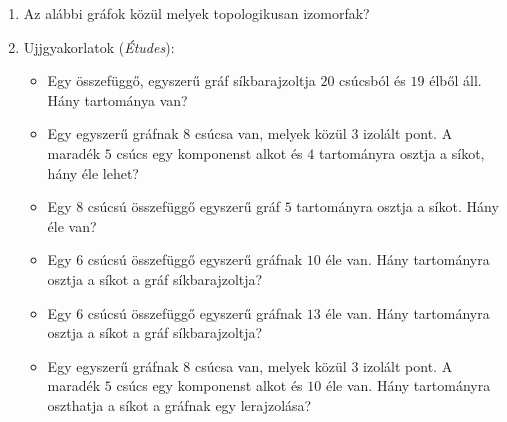 \documentclass[a4paper, 12pt]{article}
\begin{document}
\begin{enumerate}
            \hrule
            \item Az alábbi gráfok közül melyek topologikusan izomorfak?
			\begin{figure}[!ht]
				\centering
				\begin{subfigure}{0.15\textwidth}
					\centering
					
					\caption{}
				\end{subfigure}
				\begin{subfigure}{0.15\textwidth}
					\centering
					
					\caption{}
				\end{subfigure}
				\begin{subfigure}{0.15\textwidth}
					\centering
					
					\caption{}
				\end{subfigure}
				\begin{subfigure}{0.15\textwidth}
					\centering
					
					\caption{}
				\end{subfigure}
				\begin{subfigure}{0.15\textwidth}
					\centering
					
					\caption{}
				\end{subfigure}
				\begin{subfigure}{0.15\textwidth}
					\centering
					
					\caption{}
				\end{subfigure}
			\end{figure}
                
            \item Ujjgyakorlatok (\textit{Études}):
            \begin{itemize}
                \item Egy összefüggő, egyszerű gráf síkbarajzoltja $20$ csúcsból és $19$ élből áll. Hány tartománya van?
                \item Egy egyszerű gráfnak $8$ csúcsa van, melyek közül $3$ izolált pont. A maradék $5$ csúcs egy komponenst alkot és $4$ tartományra osztja a síkot, hány éle lehet?
                \item Egy $8$ csúcsú összefüggő egyszerű gráf $5$ tartományra osztja a síkot. Hány éle van?
                \item Egy $6$ csúcsú összefüggő egyszerű gráfnak $10$ éle van. Hány tartományra osztja a síkot a gráf síkbarajzoltja?
                \item Egy $6$ csúcsú összefüggő egyszerű gráfnak $13$ éle van. Hány tartományra osztja a síkot a gráf síkbarajzoltja?
                \item Egy egyszerű gráfnak $8$ csúcsa van, melyek közül $3$ izolált pont. A maradék $5$ csúcs egy komponenst alkot és $10$ éle van. Hány tartományra oszthatja a síkot a gráfnak egy lerajzolása?
            \end{itemize}
        

\end{enumerate}
\end{document}
